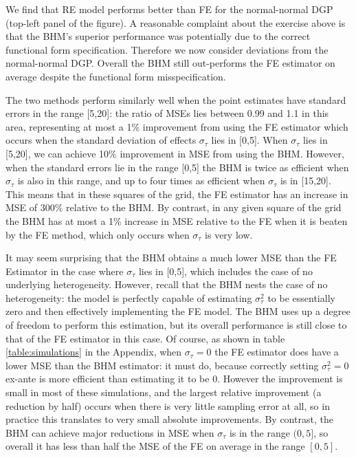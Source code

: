\documentclass[12pt]{article}
\begin{document}
We find that RE model performs better than FE for the normal-normal DGP (top-left panel of the figure). A reasonable complaint about the exercise above is that the BHM's superior performance was potentially due to the correct functional form specification. Therefore we now consider deviations from the normal-normal DGP. Overall the BHM still out-performs the FE estimator on average despite the functional form misspecification.

The two methods perform similarly well when the point estimates have standard errors in the range [5,20]: the ratio of MSEs lies between 0.99 and 1.1 in this area, representing at most a 1\% improvement from using the FE estimator which occurs when the standard deviation of effects $\sigma_{\tau}$ lies in [0,5]. When $\sigma_{\tau}$ lies in [5,20], we can achieve 10\% improvement in MSE from using the BHM. However, when the standard errors lie in the range [0,5] the BHM is twice as efficient when $\sigma_{\tau}$ is also in this range, and up to four times as efficient when $\sigma_{\tau}$ is in [15,20]. This means that in these squares of the grid, the FE estimator has an increase in MSE of 300\% relative to the BHM. By contrast, in any given square of the grid the BHM has at most a 1\% increase in MSE relative to the FE when it is beaten by the FE method, which only occurs when $\sigma_{\tau}$ is very low.

It may seem surprising that the BHM obtains a much lower MSE than the FE Estimator in the case where $\sigma_{\tau}$ lies in [0,5], which includes the case of no underlying heterogeneity. However, recall that the BHM nests the case of no heterogeneity: the model is perfectly capable of estimating $\sigma^2_{\tau}$ to be essentially zero and then effectively implementing the FE model. The BHM uses up a degree of freedom to perform this estimation, but its overall performance is still close to that of the FE estimator in this case. Of course, as shown in table \ref{table:simulations} in the Appendix, when $\sigma_{\tau} = 0$ the FE estimator does have a lower MSE than the BHM estimator: it must do, because correctly setting $\sigma^2_{\tau} = 0$ ex-ante is more efficient than estimating it to be 0. However the improvement is small in most of these simulations, and the largest relative improvement (a reduction by half) occurs when there is very little sampling error at all, so in practice this translates to very small absolute improvements. By contrast, the BHM can achieve major reductions in MSE when $\sigma_{\tau}$ is in the range $(0,5]$, so overall it has less than half the MSE of the FE on average in the range $[0,5]$.
\end{document}
